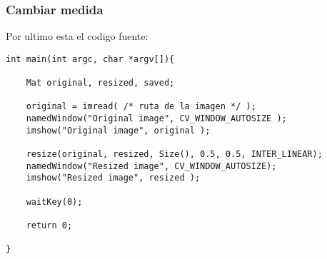 \begin{frame}[fragile]
   \frametitle{Cambiar medida}

    Por ultimo esta el codigo fuente:

    \scriptsize

    \begin{lstlisting}
int main(int argc, char *argv[]){

    Mat original, resized, saved;

    original = imread( /* ruta de la imagen */ );
    namedWindow("Original image", CV_WINDOW_AUTOSIZE );
    imshow("Original image", original );

    resize(original, resized, Size(), 0.5, 0.5, INTER_LINEAR);
    namedWindow("Resized image", CV_WINDOW_AUTOSIZE);
    imshow("Resized image", resized );

    waitKey(0);

    return 0;

}
    \end{lstlisting}

\end{frame}

